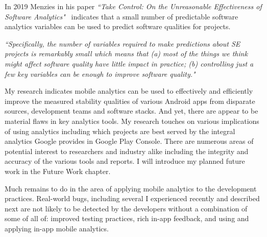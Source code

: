 In 2019 Menzies in his paper \emph{``Take Control: On the Unreasonable Effectiveness of Software Analytics"}~\cite{menzies2019take} indicates that a small number of predictable software analytics variables can be used to predict software qualities for projects. 

\emph{``Specifically, the number of variables required to make predictions about SE projects is remarkably small which means that (a) most of the things we think might affect software quality have little impact in practice; (b) controlling just a few key variables can be enough to improve software quality."}


My research indicates mobile analytics can be used to effectively and efficiently improve the measured stability qualities of various Android apps from disparate sources, development teams and software stacks. And yet, there are appear to be material flaws in key analytics tools. My research touches on various implications of using analytics including which projects are best served by the integral analytics Google provides in Google Play Console. There are numerous areas of potential interest to researchers and industry alike including the integrity and accuracy of the various tools and reports. I will introduce my planned future work in the Future Work chapter.


Much remains to do in the area of applying mobile analytics to the development practices. Real-world bugs, including several I experienced recently and described next are not likely to be detected by the developers without a combination of some of all of: improved testing practices, rich in-app feedback, and using and applying in-app mobile analytics.

